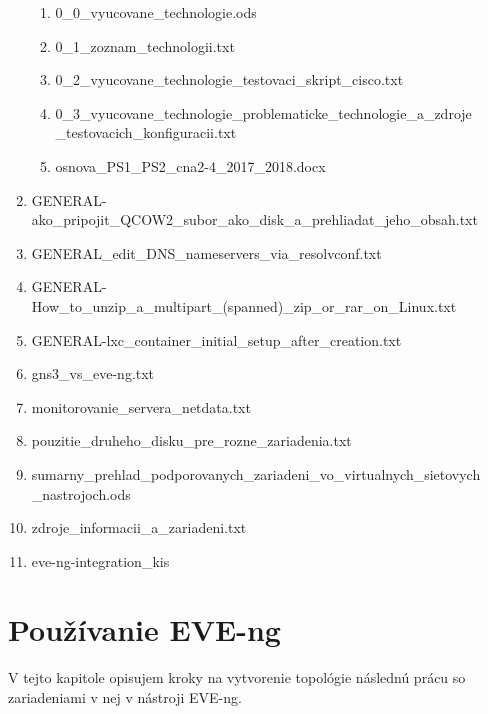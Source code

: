 \begin{enumerate}[noitemsep,label*=\thesection.\arabic*.]
\begin{enumerate}[noitemsep,label*=\arabic*.]
        \item \label{item:zoznam_technologii_s_podporou_zariadeni} 0\_0\_vyucovane\_technologie.ods
        \item \label{item:zoznam_technologii_txt} 0\_1\_zoznam\_technologii.txt
        \item \label{item:cisco_feature_testing_skript} 0\_2\_vyucovane\_technologie\_testovaci\_skript\_cisco.txt
        \item 0\_3\_vyucovane\_technologie\_problematicke\_technologie\_a\_zdroje\\\_testovacich\_konfiguracii.txt
        \item osnova\_PS1\_PS2\_cna2-4\_2017\_2018.docx
    \end{enumerate}
    
    \item GENERAL-ako\_pripojit\_QCOW2\_subor\_ako\_disk\_a\_prehliadat\_jeho\_obsah.txt
    \item GENERAL\_edit\_DNS\_nameservers\_via\_resolvconf.txt
    \item GENERAL-How\_to\_unzip\_a\_multipart\_(spanned)\_zip\_or\_rar\_on\_Linux.txt
    \item GENERAL-lxc\_container\_initial\_setup\_after\_creation.txt
    \item gns3\_vs\_eve-ng.txt
    \item \label{item:monitorovanie} monitorovanie\_servera\_netdata.txt
    \item pouzitie\_druheho\_disku\_pre\_rozne\_zariadenia.txt
    \item \label{item:sumarny_prehlad_zariadeni} sumarny\_prehlad\_podporovanych\_zariadeni\_vo\_virtualnych\_sietovych\\\_nastrojoch.ods
    \item \label{item:zdroje_informacii_a_zariadeni} zdroje\_informacii\_a\_zariadeni.txt
    \item \label{item:upraveny_integracny_balicek_win} eve-ng-integration\_kis
\end{enumerate}





\newpage

\section{Používanie EVE-ng}
\label{chap:pouzivanie_eve_ng}

V tejto kapitole opisujem kroky na vytvorenie topológie následnú prácu so zariadeniami v nej v nástroji EVE-ng.




